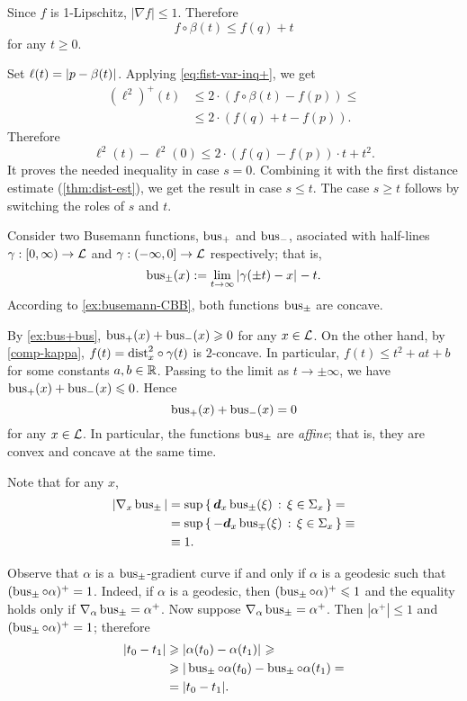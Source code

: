 Since $f$ is 1-Lipschitz, $|\nabla f|\le1$.
Therefore 
\[f\circ\beta(t)\le f(q)+t\]
for any $t\ge0$.

Set $\ell(t)=\dist{p}{\beta(t)}{}$.
Applying \ref{eq:fist-var-inq+}, we get
\begin{align*}
(\ell^2)^+(t)
&\le 2\cdot \left(f\circ\beta(t)-f(p)\right)\le 
\\
&\le2\cdot\left(f(q)+t-f(p)\right).
\end{align*}
Therefore 
\[\ell^2(t)-\ell^2(0)\le 2\cdot\left(f(q)-f(p)\right)\cdot t + t^2.\]
It proves the needed inequality in case $s=0$.
Combining it with the first distance estimate (\ref{thm:dist-est}), we get the result in case $s\le t$.
The case $s\ge t$ follows by switching the roles of $s$ and $t$.
\qeds


 Consider two Busemann functions, $\operatorname{\rm bus}\nolimits_+$ and $\operatorname{\rm bus}\nolimits_-$, asociated with half-lines $\gamma:[0,\infty)\to \mathcal{L}$ and $\gamma:(-\infty,0]\to \mathcal{L}$ respectively; that is,
\[
\bus_\pm(x)
\df
\lim_{t\to\infty}\dist{\gamma(\pm t)}{x}{}- t.
\]
According to \ref{ex:busemann-CBB}, 
both functions $\operatorname{\rm bus}\nolimits_\pm$ are concave.

By \ref{ex:bus+bus}, $\operatorname{\rm bus}\nolimits_+(x)+\operatorname{\rm bus}\nolimits_-(x)\geqslant0$ for any $x\in \mathcal{L}$.
On the other hand, by \ref{comp-kappa}, 
$f(t)=\mathrm{dist}_x^2\circ\gamma(t)$ 
is $2$-concave.
In particular, $f(t)\le t^2+at+b$ for some constants $a,b\in\mathbb{R}$. 
Passing to the limit as $t\to\pm\infty$, we have $\operatorname{\rm bus}\nolimits_+(x)+\operatorname{\rm bus}\nolimits_-(x)\leqslant0$.
Hence
\[
\operatorname{\rm bus}\nolimits_+(x)+\operatorname{\rm bus}\nolimits_-(x)= 0
\]
for any $x\in \mathcal{L}$.
In particular, the functions $\operatorname{\rm bus}\nolimits_\pm$ are \emph{affine};
that is, they are convex and concave at the same time.

Note that for any $x$,
\begin{align*}
|\nabla_x \operatorname{\rm bus}\nolimits_\pm|
&=\sup\left\{\,{\bm{d}_x\operatorname{\rm bus}\nolimits_\pm(\xi)}\,:\,{\xi\in\Sigma_x}\,\right\}=
\\
&=\sup\left\{\,{-\bm{d}_x\operatorname{\rm bus}\nolimits_\mp(\xi)}\,:\,{\xi\in\Sigma_x}\,\right\}\equiv
\\
&\equiv1.
\end{align*}

Observe that $\alpha$ is a $\operatorname{\rm bus}\nolimits_\pm$-gradient curve
if and only if $\alpha$ is a geodesic such that $(\operatorname{\rm bus}\nolimits_\pm\circ\alpha)^+=1$.
Indeed, if $\alpha$ is a geodesic, then $(\operatorname{\rm bus}\nolimits_\pm\circ\alpha)^+\leqslant 1$ and the equality holds only if $\nabla_\alpha\operatorname{\rm bus}\nolimits_\pm=\alpha^+$.
Now suppose $\nabla_\alpha\operatorname{\rm bus}\nolimits_\pm=\alpha^+$.
Then $|\alpha^+|\le 1$ and $(\operatorname{\rm bus}\nolimits_\pm\circ\alpha)^+=1$; therefore 
\begin{align*}
|t_0-t_1|&\ge \dist{\alpha(t_0)}{\alpha(t_1)}{}\ge
\\
&\ge|\bus_\pm\circ\alpha(t_0)-\bus_\pm\circ\alpha(t_1)=
\\
&=|t_0-t_1|.
\end{align*}

